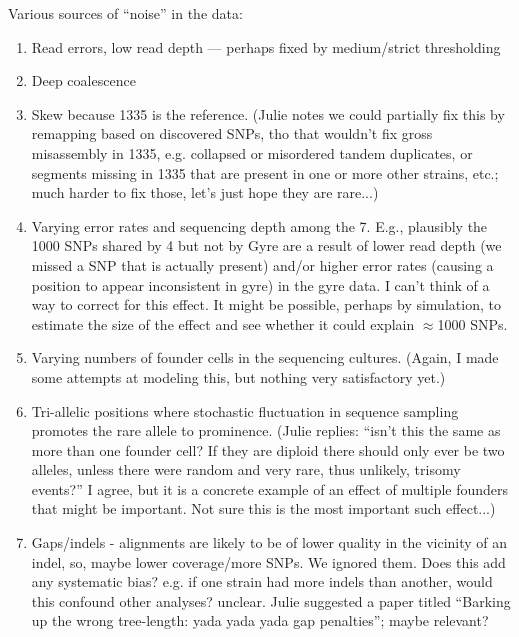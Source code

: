 \documentclass{article}\usepackage[]{graphicx}\usepackage[]{color}
\begin{document}
 Various sources of ``noise'' in the data:
\begin{enumerate}
  \item Read errors, low read depth  --- perhaps fixed by medium/strict thresholding
  \item Deep coalescence
  \item Skew because 1335 is the reference.  (Julie notes we could partially fix this by remapping based on discovered
    SNPs, tho that wouldn't fix gross misassembly in 1335, e.g. collapsed or misordered tandem duplicates, or segments
    missing in 1335 that are present in one or more other strains, etc.; much harder to fix those, let's just hope they
    are rare...)
  \item Varying error rates and sequencing depth among the 7.  E.g., plausibly the 1000 SNPs shared by 4 but not by Gyre
    are a result of lower read depth (we missed a SNP that is actually present) and/or higher error rates (causing a
    position to appear inconsistent in gyre) in the gyre data.  I can't think of a way to correct for this effect.  It
    might be possible, perhaps by simulation, to estimate the size of the effect and see whether it could explain
    $\approx$1000 SNPs.
  \item Varying numbers of founder cells in the sequencing cultures.  (Again, I made some attempts at modeling this, but
    nothing very satisfactory yet.)
  \item Tri-allelic positions where stochastic fluctuation in sequence sampling promotes the rare allele to prominence.
    (Julie replies: ``isn't this the same as more than one founder cell? If they are diploid there should only ever be
    two alleles, unless there were random and very rare, thus unlikely, trisomy events?''  I agree, but it is a concrete
    example of an effect of multiple founders that might be important.  Not sure this is the most important such
    effect...)
  \item Gaps/indels - alignments are likely to be of lower quality in the vicinity of an indel, so, maybe lower
    coverage/more SNPs.  We ignored them.  Does this add any systematic bias?  e.g. if one strain had more indels than
    another, would this confound other analyses?  unclear.  Julie suggested a paper titled ``Barking up the wrong
    tree-length: yada yada yada gap penalties''; maybe relevant?
\end{enumerate}
\end{document}
